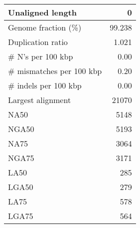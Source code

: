 \documentclass[12pt,a4paper]{article}
\begin{document}
\begin{table}[ht]
\begin{center}
\begin{tabular}{|l*{1}{|r}|}
Unaligned length & 0 \\ \hline
Genome fraction (\%) & 99.238 \\ \hline
Duplication ratio & 1.021 \\ \hline
\# N's per 100 kbp & 0.00 \\ \hline
\# mismatches per 100 kbp & 0.20 \\ \hline
\# indels per 100 kbp & 0.00 \\ \hline
Largest alignment & 21070 \\ \hline
NA50 & 5148 \\ \hline
NGA50 & 5193 \\ \hline
NA75 & 3064 \\ \hline
NGA75 & 3171 \\ \hline
LA50 & 285 \\ \hline
LGA50 & 279 \\ \hline
LA75 & 578 \\ \hline
LGA75 & 564 \\ \hline
\end{tabular}
\end{center}
\end{table}
\end{document}
